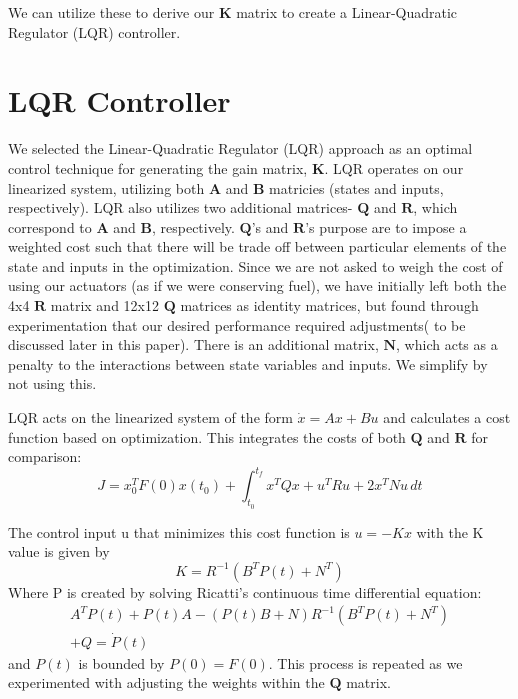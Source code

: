 \documentclass{article}
\begin{document}
\begin{multicols}{2}
We can utilize these to derive our $\boldsymbol{K}$ matrix to create a Linear-Quadratic Regulator (LQR) controller.

\section*{LQR Controller}
We selected the Linear-Quadratic Regulator (LQR) approach as an optimal control technique for generating the gain matrix, $
\boldsymbol{K}$.  LQR operates on our linearized system, utilizing both $\boldsymbol{A}$ and $\boldsymbol{B}$ matricies (states 
and inputs, respectively). LQR also utilizes two additional matrices- $\boldsymbol{Q}$ and $\boldsymbol{R}$, which correspond to $
\boldsymbol{A}$ and $\boldsymbol{B}$, respectively. $\boldsymbol{Q}$'s and $\boldsymbol{R}$'s purpose are to impose a weighted 
cost such that there will be trade off between particular elements of the state and inputs in the optimization. Since we are not asked 
to weigh the cost of using our actuators (as if we were conserving fuel), we have initially left both the  4x4 $\boldsymbol{R}$ matrix 
and 12x12 $\boldsymbol{Q}$ matrices as identity matrices, but found through experimentation that our 
desired performance required adjustments( to be discussed later in this paper). There is an additional matrix, $\boldsymbol{N}$, 
which acts as a penalty to the interactions between state variables and inputs.  We simplify by not using this.

LQR acts on the linearized system of the form $\dot{x} = Ax + Bu$ and calculates a cost function based on optimization.  This 
integrates the costs of both $\boldsymbol{Q}$ and $\boldsymbol{R}$ for comparison:
\begin{equation}
J =x_0^TF(0)x(t_0) +  \int_{t_0}^{t_f} x^TQx+u^TRu +2x^TNu\,dt 
\end{equation}

The control input u that minimizes this cost function is $u= -Kx$ with the K value is given by
\begin{equation}
K = R^{-1}(B^TP(t) + N^T)
\end{equation}
\noindent
Where P is created by solving Ricatti's continuous time differential equation:
\begin{align}
A^TP(t) + P(t)A - (P(t)B + N)R^{-1}(B^TP(t) + N^T) \nonumber\\+ Q = \dot{P}(t)
\end{align}
\noindent
and $P(t)$ is bounded by $P(0) = F(0)$. This process is repeated as we experimented with adjusting the weights within the $
\boldsymbol{Q}$ matrix.


\end{multicols}
\end{document}
